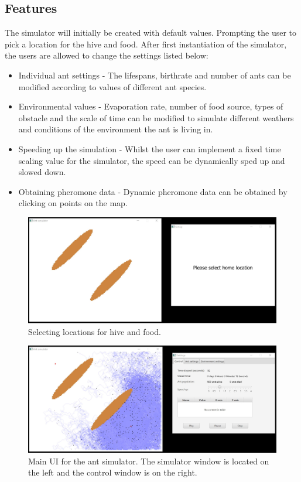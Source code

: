 \documentclass[a4paper, oneside, 11pt]{report}
\begin{document}
\subsection{Features}
The simulator will initially be created with default values. Prompting the user to pick a location for the hive and food. After first instantiation of the simulator, the users are allowed to change the settings listed below:
\begin{itemize}
	\item Individual ant settings - The lifespans, birthrate and number of ants can be modified according to values of different ant species.
	\item Environmental values - Evaporation rate, number of food source, types of obstacle and the scale of time can be modified to simulate different weathers and conditions of the environment the ant is living in.
	\item Speeding up the simulation - Whilst the user can implement a fixed time scaling value for the simulator, the speed can be dynamically sped up and slowed down.
	\item Obtaining pheromone data - Dynamic pheromone data can be obtained by clicking on points on the map.
\end{itemize}

\begin{figure}[htb]
	\begin{center}
		\includegraphics[width=1.0 \columnwidth]{Location_Selection.jpg}
		\caption{Selecting locations for hive and food.}
		\label{fig:Location_Selection}
	\end{center}
\end{figure}

\begin{figure}[htb]
	\begin{center}
		\includegraphics[width=1.0 \columnwidth]{Main_Simulator.jpg}
		\caption{Main UI for the ant simulator. The simulator window is located on the left and the control window is on the right.}
		\label{fig:Main_Simulator}
	\end{center}
\end{figure}
\end{document}
